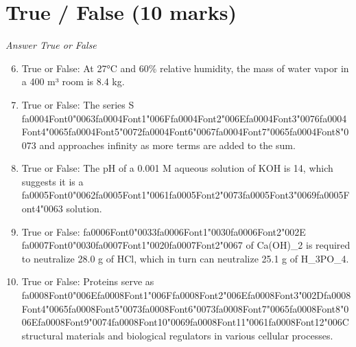 \documentclass[12pt]{article}
\begin{document}
\section*{True / False (10 marks)}
\textit{Answer True or False}
\begin{enumerate}[label=\arabic*.]
\setcounter{enumi}{5}
\item True or False: At 27°C and 60\% relative humidity, the mass of water vapor in a 400 m³ room is 8.4 kg.
\item True or False: The series S {\csname fa0004Font0\endcsname\char"0063}{\csname fa0004Font1\endcsname\char"006F}{\csname fa0004Font2\endcsname\char"006E}{\csname fa0004Font3\endcsname\char"0076}{\csname fa0004Font4\endcsname\char"0065}{\csname fa0004Font5\endcsname\char"0072}{\csname fa0004Font6\endcsname\char"0067}{\csname fa0004Font7\endcsname\char"0065}{\csname fa0004Font8\endcsname\char"0073} and approaches infinity as more terms are added to the sum.
\item True or False: The pH of a 0.001 M aqueous solution of KOH is 14, which suggests it is a {\csname fa0005Font0\endcsname\char"0062}{\csname fa0005Font1\endcsname\char"0061}{\csname fa0005Font2\endcsname\char"0073}{\csname fa0005Font3\endcsname\char"0069}{\csname fa0005Font4\endcsname\char"0063} solution.
\item True or False: {\csname fa0006Font0\endcsname\char"0033}{\csname fa0006Font1\endcsname\char"0030}{\csname fa0006Font2\endcsname\char"002E} {\csname fa0007Font0\endcsname\char"0030}{\csname fa0007Font1\endcsname\char"0020}{\csname fa0007Font2\endcsname\char"0067} of Ca(OH)\_2 is required to neutralize 28.0 g of HCl, which in turn can neutralize 25.1 g of H\_3PO\_4.
\item True or False: Proteins serve as {\csname fa0008Font0\endcsname\char"006E}{\csname fa0008Font1\endcsname\char"006F}{\csname fa0008Font2\endcsname\char"006E}{\csname fa0008Font3\endcsname\char"002D}{\csname fa0008Font4\endcsname\char"0065}{\csname fa0008Font5\endcsname\char"0073}{\csname fa0008Font6\endcsname\char"0073}{\csname fa0008Font7\endcsname\char"0065}{\csname fa0008Font8\endcsname\char"006E}{\csname fa0008Font9\endcsname\char"0074}{\csname fa0008Font10\endcsname\char"0069}{\csname fa0008Font11\endcsname\char"0061}{\csname fa0008Font12\endcsname\char"006C} structural materials and biological regulators in various cellular processes.
\end{enumerate}
\end{document}
